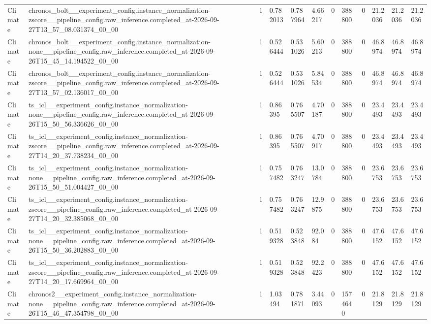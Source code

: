 \begin{tabular}{llllllllllll}
Climate & chronos\_bolt\_\_experiment\_config.instance\_normalization-zscore\_\_pipeline\_config.raw\_inference.completed\_at-2026-09-27T13\_57\_08.031374\_00\_00 & 1 & 0.782013 & 0.787964 & 4.66217 & 0 & 388800 & 0 & 21.2036 & 21.2036 & 21.2036 \\
Climate & chronos\_bolt\_\_experiment\_config.instance\_normalization-none\_\_pipeline\_config.raw\_inference.completed\_at-2026-09-26T15\_45\_14.194522\_00\_00 & 1 & 0.526444 & 0.531026 & 5.60213 & 0 & 388800 & 0 & 46.8974 & 46.8974 & 46.8974 \\
Climate & chronos\_bolt\_\_experiment\_config.instance\_normalization-zscore\_\_pipeline\_config.raw\_inference.completed\_at-2026-09-27T13\_57\_02.136017\_00\_00 & 1 & 0.526444 & 0.531026 & 5.84534 & 0 & 388800 & 0 & 46.8974 & 46.8974 & 46.8974 \\
Climate & ts\_icl\_\_experiment\_config.instance\_normalization-none\_\_pipeline\_config.raw\_inference.completed\_at-2026-09-26T15\_50\_56.336626\_00\_00 & 1 & 0.86395 & 0.765507 & 4.70187 & 0 & 388800 & 0 & 23.4493 & 23.4493 & 23.4493 \\
Climate & ts\_icl\_\_experiment\_config.instance\_normalization-zscore\_\_pipeline\_config.raw\_inference.completed\_at-2026-09-27T14\_20\_37.738234\_00\_00 & 1 & 0.86395 & 0.765507 & 4.70917 & 0 & 388800 & 0 & 23.4493 & 23.4493 & 23.4493 \\
Climate & ts\_icl\_\_experiment\_config.instance\_normalization-none\_\_pipeline\_config.raw\_inference.completed\_at-2026-09-26T15\_50\_51.004427\_00\_00 & 1 & 0.757482 & 0.763247 & 13.0784 & 0 & 388800 & 0 & 23.6753 & 23.6753 & 23.6753 \\
Climate & ts\_icl\_\_experiment\_config.instance\_normalization-zscore\_\_pipeline\_config.raw\_inference.completed\_at-2026-09-27T14\_20\_32.385068\_00\_00 & 1 & 0.757482 & 0.763247 & 12.9875 & 0 & 388800 & 0 & 23.6753 & 23.6753 & 23.6753 \\
Climate & ts\_icl\_\_experiment\_config.instance\_normalization-none\_\_pipeline\_config.raw\_inference.completed\_at-2026-09-26T15\_50\_36.202883\_00\_00 & 1 & 0.519328 & 0.523848 & 92.084 & 0 & 388800 & 0 & 47.6152 & 47.6152 & 47.6152 \\
Climate & ts\_icl\_\_experiment\_config.instance\_normalization-zscore\_\_pipeline\_config.raw\_inference.completed\_at-2026-09-27T14\_20\_17.669964\_00\_00 & 1 & 0.519328 & 0.523848 & 92.2423 & 0 & 388800 & 0 & 47.6152 & 47.6152 & 47.6152 \\
Climate & chronos2\_\_experiment\_config.instance\_normalization-none\_\_pipeline\_config.raw\_inference.completed\_at-2026-09-26T15\_46\_47.354798\_00\_00 & 1 & 1.03494 & 0.781871 & 3.44093 & 0 & 1574640 & 0 & 21.8129 & 21.8129 & 21.8129 \\

\end{tabular}
